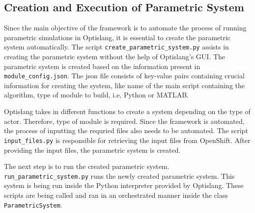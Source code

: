 \subsection{Creation and Execution of Parametric System}
Since the main objective of the framework is to automate the process of running parametric simulations in Optislang, it is essential to create the parametric 
system automatically. The script \texttt{create\_parametric\_system.py} assists in creating the parametric system without the help of Optislang's GUI. The 
parametric system is created based on the information present in \texttt{module\_config.json}. The \acrshort{json} file consists of key-value pairs containing 
crucial information for creating the system, like name of the main script containing the algorithm, type of module to build, i.e, Python or MATLAB. 

Optislang takes in different functions to create a system depending on the type of actor. Therefore, type of module is required. Since the framework is automated,
the process of inputting the requried files also needs to be automated. The script \texttt{input\_files.py} is responsible for retrieving the input files from 
OpenShift. 
After providing the input files, the parametric system is created. 

The next step is to run the created parametric system. \texttt{run\_parametric\_system.py} runs the newly created parametric system. This system is being run 
inside the Python interpreter provided by Optislang. These scripts are being called and ran in an orchestrated manner inside the class \texttt{ParametricSystem}.

